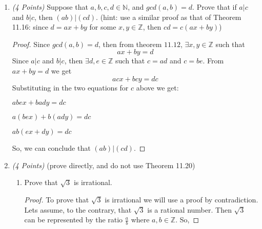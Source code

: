 \documentclass[10pt]{article} %
\newcommand{\N}{\mathbb{N}}
\newcommand{\Z}{\mathbb{Z}}
\newcommand{\points}[1]{{\it (#1 Points)}}
\begin{document}
\begin{enumerate}
\begin{proof}
{\bf Step 1:} We must prove that if $gcd(a,c) = gcd(b,c) = 1$ then $gcd(ab,c) = 1$.  From theorem $11.12$, $gcd(a,c) = 1$ iff $\exists x,y \in \Z$, such that:$$ax + cy = 1$$ and $$bw + cz = 1$$
Multiplying this out, we get:

$abxw = (1 - cy)(1 - cz)$

$abxw = 1 - c(y + Z -  cyz)$

$c(y + Z - cyz) + abxw = 1$

Therefore, $gcd(ab,c) = 1$

{\bf Step 2:} We must prove that if $gcd(ab,c) = 1$ then $gcd(a,c) = gcd(b,c) = 1$.  

So, $\exists x,y \in \Z$ such that $abx + cy = 1$, which can be rewritten as: $$b(ax) + cy = 1$$
Hence, there exist integer solutions to the equations $ax + cy = 1$ and $bw + cz = 1$.  This implies that $gcd(a,c) = gcd(b,c) = 1$.  
\end{proof}
\bigskip

\item\points{4} Suppose that $a,b,c,d\in \N$, and $gcd(a,b)=d$. Prove that if $a |c$ and $b|c$, then $(ab)|(cd)$.
(hint: use a similar proof as that of Theorem 11.16: since $d=ax+by$ for some $x,y\in \Z$, then $cd=c(ax+by)$)

\bigskip

\begin{proof} Since $gcd(a,b) = d$, then from theorem $11.12$, $\exists x,y \in \Z$ such that $$ax + by = d$$ 
Since $a|c$ and $b|c$, then $\exists d,e \in \Z$ such that $c = ad$ and $c = be$.  From $ax + by = d$ we get $$acx + bcy = dc$$
Substituting in the two equations for $c$ above we get:

$abex + bady = dc$

$a(bex) + b(ady) = dc$

$ab(ex + dy) = dc$

So, we can conclude that $(ab)|(cd)$.  
\end{proof}

\bigskip

\item\points{4} (prove directly, and do not use Theorem 11.20)
\begin{enumerate}
  \item Prove that $\sqrt{3}$ is irrational.
  
  \bigskip
  
  \begin{proof} To prove that $\sqrt{3}$ is irrational we will use a proof by contradiction.  Lets assume, to the contrary, that $\sqrt{3}$ is a rational number.  Then $\sqrt{3}$ can be represented by the ratio $\frac{a}{b}$ where $a,b \in \Z$.  So, 
  

\end{proof}
\end{enumerate}
\end{enumerate}
\end{document}
